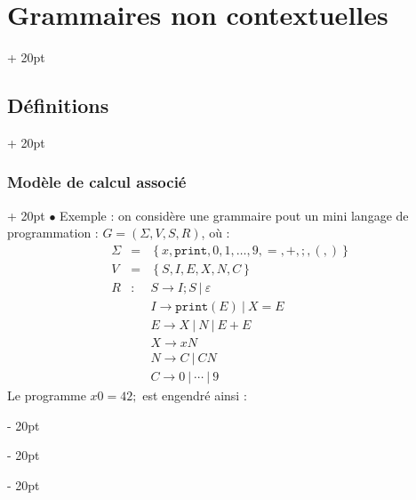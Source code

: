 \documentclass[a4paper, 12pt, twoside]{article}
\newcommand{\lr}[1]{\left( #1 \right)}
\newcommand{\set}[1]{\left\{ #1 \right\}}
\newcommand{\ind}[1][20pt]{\advance\leftskip + #1}
\newcommand{\deind}[1][20pt]{\advance\leftskip - #1}
\newenvironment{indt}[2][20pt]{#2 \par \ind[#1]}{\par \deind} %
\begin{document}
\begin{indt}{\section{Grammaires non contextuelles}}
\begin{indt}{\subsection{Définitions}}
            \vspace{12pt}
            
            \begin{indt}{\subsubsection{Modèle de calcul associé}}
                $\bullet$  Exemple : on considère une grammaire pout un mini langage de programmation : $G = \lr{\Sigma, V, S, R}$, où :
                \[
                    \begin{array}{rcl}
                        \Sigma &=& \set{x, \mathtt{print}, 0, 1, \ldots, 9, =, +, ;, (, )}
                        \\
                        V &=& \set{S, I, E, X, N, C}
                        \\
                        R
                        &:& S \rightarrow I ; S \ |\ \varepsilon
                        \\
                        && I \rightarrow \mathtt{print}(E) \ |\ X = E
                        \\
                        && E \rightarrow X \ |\ N \ |\ E + E
                        \\
                        && X \rightarrow xN
                        \\
                        && N \rightarrow C \ |\ CN
                        \\
                        && C \rightarrow 0 \ |\ \cdots \ |\ 9
                    \end{array}
                \]
                Le programme $x0 = 42;$ est engendré ainsi :
                    

\end{indt}
\end{indt}
\end{indt}
\end{document}
